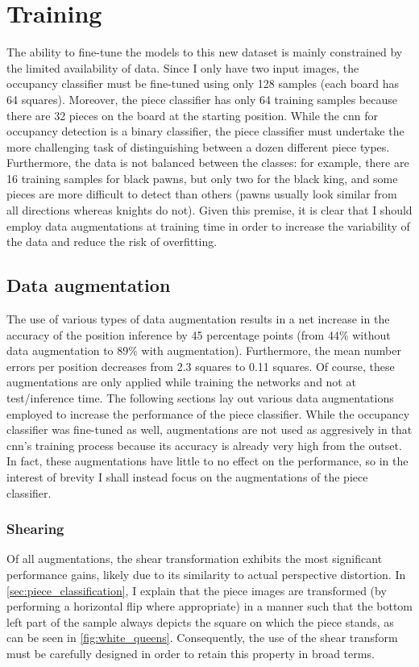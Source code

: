 \documentclass[../report.tex]{subfiles}
\begin{document}
\section{Training}
The ability to fine-tune the models to this new dataset is mainly constrained by the limited availability of data.
Since I only have two input images, the occupancy classifier must be fine-tuned using only 128 samples (each board has 64 squares).
Moreover, the piece classifier has only 64 training samples because there are 32 pieces on the board at the starting position.
While the \gls{cnn} for occupancy detection is a binary classifier, the piece classifier must undertake the more challenging task of distinguishing between a dozen different piece types.
Furthermore, the data is not balanced between the classes: for example, there are 16 training samples for black pawns, but only two for the black king, and some pieces are more difficult to detect than others (pawns usually look similar from all directions whereas knights do not).
Given this premise, it is clear that I should employ data augmentations at training time in order to increase the variability of the data and reduce the risk of overfitting.

\subsection{Data augmentation}
The use of various types of data augmentation results in a net increase in the accuracy of the position inference by 45 percentage points (from 44\% without data augmentation to 89\% with augmentation).
Furthermore, the mean number errors per position decreases from 2.3 squares to 0.11 squares.
Of course, these augmentations are only applied while training the networks and not at test/inference time.
The following sections lay out various data augmentations employed to increase the performance of the piece classifier.
While the occupancy classifier was fine-tuned as well, augmentations are not used as aggresively in that \gls{cnn}'s training process because its accuracy is already very high from the outset.
In fact, these augmentations have little to no effect on the performance, so in the interest of brevity I shall instead focus on the augmentations of the piece classifier.

\subsubsection{Shearing}
Of all augmentations, the shear transformation exhibits the most significant performance gains, likely due to its similarity to actual perspective distortion.
In \cref{sec:piece_classification}, I explain that the piece images are transformed (by performing a horizontal flip where appropriate) in a manner such that the bottom left part of the sample always depicts the square on which the piece stands, as can be seen in \cref{fig:white_queens}.
Consequently, the use of the shear transform must be carefully designed in order to retain this property in broad terms.
\end{document}
